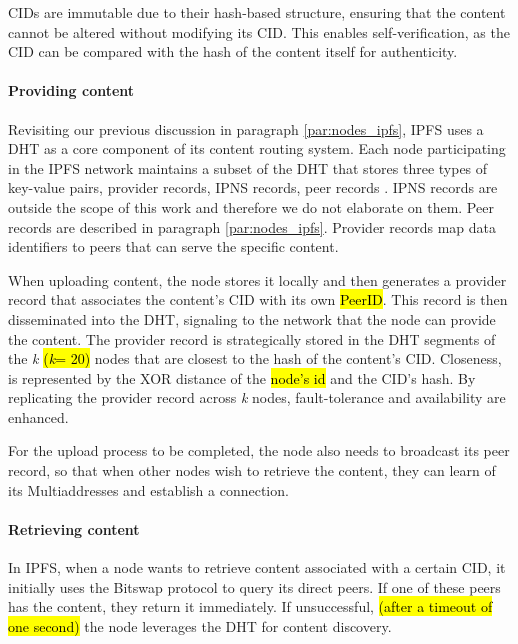 CIDs are immutable due to their hash-based structure, ensuring that the content cannot be altered without modifying its CID. This enables self-verification, as the CID can be compared with the hash of the content itself for authenticity.

\paragraph{Providing content}\label{par:providing_ipfs}
Revisiting our previous discussion in paragraph \ref{par:nodes_ipfs}, IPFS uses a DHT as a core component of its content routing system. Each node participating in the IPFS network maintains a subset of the DHT that stores three types of key-value pairs, provider records, IPNS records, peer records \citep{schmahmann_2020}. IPNS records are outside the scope of this work and therefore we do not elaborate on them. Peer records are described in paragraph \ref{par:nodes_ipfs}. Provider records map data identifiers to peers that can serve the specific content.

When uploading content, the node stores it locally and then generates a provider record that associates the content's CID with its own \hl{PeerID}. This record is then disseminated into the DHT, signaling to the network that the node can provide the content. The provider record is strategically stored in the DHT segments of the \textit{k} \hl{(\textit{k}= 20)} nodes that are closest to the hash of the content's CID. Closeness, is represented by the XOR distance \citep{maymounkov_2002} of the \hl{node's id} and the CID's hash. By replicating the provider record across \textit{k} nodes, fault-tolerance and availability are enhanced. 

For the upload process to be completed, the node also needs to broadcast its peer record, so that when other nodes wish to retrieve the content, they can learn of its Multiaddresses and establish a connection.

\paragraph{Retrieving content}\label{par:retrieving_ipfs}
In IPFS, when a node wants to retrieve content associated with a certain CID, it initially uses the Bitswap protocol to query its direct peers.  If one of these peers has the content, they return it immediately. If unsuccessful, \hl{(after a timeout of one second)} the node leverages the DHT for content discovery.


